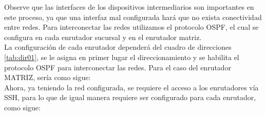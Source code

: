 \documentclass[conference]{IEEEtran}
\begin{document}
Observe que las interfaces de los dispositivos intermediarios son importantes en este proceso, ya que una interfaz mal configurada hará que no exista conectividad entre redes. Para interconectar las redes utilizamos el protocolo OSPF, el cual se configura en cada enrutador sucursal y en el enrutador matriz.\\ 
La configuración de cada enrutador dependerá del cuadro de direcciones \ref{tab:dir01}, se le asigna en primer lugar el direccionamiento y se habilita el protocolo OSPF para interconectar las redes. Para el caso del enrutador MATRIZ, sería como sigue:\\



Ahora, ya teniendo la red configurada, se requiere el acceso a los enrutadores vía SSH, para lo que de igual manera requiere ser configurado para cada enrutador, como sigue:


\end{document}
